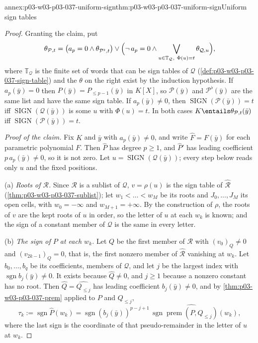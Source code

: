 \begin{annexitem}{annex:p03-w03-p03-037-uniform-sign}{thm:p03-w03-p03-037-uniform-sign}{Uniform sign tables}
\begin{proof}
Granting the claim, put
\[
\theta_{\mathcal P,t}=
\bigl(a_p=0\wedge\theta_{\mathcal P^\flat,t}\bigr)\vee
\Bigl(\neg\,a_p=0\wedge\bigvee_{u\in\mathbb T_{\mathcal Q},\ \Phi(u)=t}
\theta_{\mathcal Q,u}\Bigr),
\]
where \(\mathbb T_{\mathcal Q}\) is the finite set of words that can be sign
tables of \(\mathcal Q\) (\cref{def:p03-w03-p03-037-sign-table}) and the
\(\theta\) on the right exist by the induction hypothesis.  If
\(a_p(\bar y)=0\) then \(P(\bar y)=P_{\leq p-1}(\bar y)\) in \(K[X]\), so
\(\mathcal P(\bar y)\) and \(\mathcal P^\flat(\bar y)\) are the same list and
have the same sign table.  If \(a_p(\bar y)\neq0\), then
\(\operatorname{SIGN}(\mathcal P(\bar y))=t\) iff
\(\operatorname{SIGN}(\mathcal Q(\bar y))\) is some \(u\) with \(\Phi(u)=t\).
In both cases \(K\entails\theta_{\mathcal P,t}(\bar y)\) iff
\(\operatorname{SIGN}(\mathcal P(\bar y))=t\).

\emph{Proof of the claim.}  Fix \(K\) and \(\bar y\) with
\(a_p(\bar y)\neq0\), and write \(\hat F=F(\bar y)\) for each parametric
polynomial \(F\).  Then \(\hat P\) has degree \(p\geq1\), and \(\hat P'\) has
leading coefficient \(p\,a_p(\bar y)\neq0\), so it is not zero.  Let
\(u=\operatorname{SIGN}(\mathcal Q(\bar y))\); every step below reads only
\(u\) and the fixed positions.

(a) \emph{Roots of \(\mathcal R\).}  Since \(\mathcal R\) is a sublist of
\(\mathcal Q\), \(v=\rho(u)\) is the sign table of \(\hat{\mathcal R}\)
(\cref{thm:p03-w03-p03-037-sublist}); let \(w_1<\dots<w_M\) be its roots and
\(J_0,\dots,J_M\) its open cells, with \(w_0=-\infty\) and
\(w_{M+1}=+\infty\).  By the construction of \(\rho\), the roots of
\(v\) are the kept roots of \(u\) in order, so the letter of \(u\) at each
\(w_k\) is known; and the sign of a constant member of \(\mathcal Q\) is the
same in every letter.

(b) \emph{The sign of \(P\) at each \(w_k\).}  Let \(Q\) be the first member
of \(\mathcal R\) with \((v_0)_Q\neq0\) and \((v_{2k-1})_Q=0\), that is, the
first nonzero member of \(\hat{\mathcal R}\) vanishing at \(w_k\).  Let
\(b_0,\dots,b_q\) be its coefficients, members of \(\mathcal Q\), and let
\(j\) be the largest index with \(\operatorname{sgn}b_j(\bar y)\neq0\).  It
exists because \(\hat Q\neq0\), and \(j\geq1\) because a nonzero constant
has no root.  Then \(\hat Q=\widehat{Q_{\leq j}}\) has leading coefficient
\(b_j(\bar y)\neq0\), and by \cref{thm:p03-w03-p03-037-prem} applied to
\(P\) and \(Q_{\leq j}\),
\[
\tau_k:=\operatorname{sgn}\hat P(w_k)=
\operatorname{sgn}(b_j(\bar y))^{p-j+1}\,
\operatorname{sgn}\widehat{\operatorname{prem}(P,Q_{\leq j})}(w_k),
\]
where the last sign is the coordinate of that pseudo-remainder in the
letter of \(u\) at \(w_k\).


\end{proof}
\end{annexitem}
